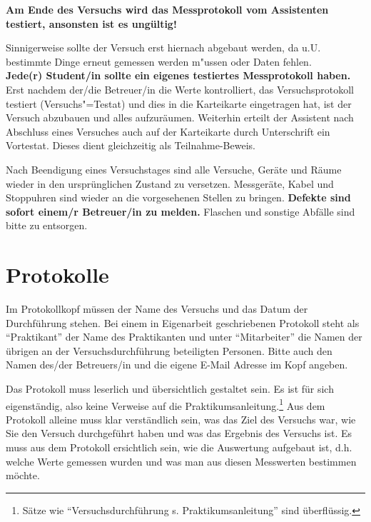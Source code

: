 \textbf{Am Ende des Versuchs wird das Messprotokoll vom Assistenten testiert, ansonsten ist es ungültig!}

Sinnigerweise sollte der Versuch erst hiernach abgebaut werden, da u.U. bestimmte Dinge erneut gemessen werden m"ussen oder Daten fehlen.\\ 
{\bf Jede(r) Student/in sollte ein eigenes testiertes Messprotokoll haben.}\\
Erst nachdem der/die Betreuer/in die Werte kontrolliert, das Versuchsprotokoll testiert (Versuchs"=Testat)  und dies in die Karteikarte eingetragen hat,
ist der Versuch abzubauen und alles aufzuräumen. Weiterhin erteilt der Assistent nach Abschluss eines Versuches auch auf der Karteikarte durch Unterschrift ein Vortestat. Dieses dient gleichzeitig als Teilnahme-Beweis.

Nach Beendigung eines Versuchstages sind alle Versuche, Geräte und Räume wieder in den ursprünglichen Zustand zu versetzen. Messgeräte, Kabel und Stoppuhren sind wieder an die vorgesehenen Stellen zu bringen. \textbf{Defekte sind sofort einem/r Betreuer/in zu melden.} Flaschen und sonstige Abfälle sind bitte zu entsorgen.


\section{Protokolle}

Im Protokollkopf müssen der Name des Versuchs und das Datum der Durchführung stehen. Bei einem in Eigenarbeit geschriebenen Protokoll steht als "`Praktikant"' der Name des Praktikanten und unter "`Mitarbeiter"' die Namen der übrigen an der Versuchsdurchführung beteiligten Personen. Bitte auch den Namen des/der Betreuers/in und die eigene E-Mail Adresse im Kopf angeben. 

Das Protokoll muss leserlich und übersichtlich gestaltet sein. Es ist für sich eigenständig, also keine Verweise auf die Praktikumsanleitung.\footnote{Sätze wie "`Versuchsdurchführung s. Praktikumsanleitung"' sind überflüssig.} Aus dem Protokoll alleine muss klar verständlich sein, was das Ziel des Versuchs war, wie Sie den Versuch durchgeführt haben und was das Ergebnis des Versuchs ist. Es muss aus dem Protokoll ersichtlich sein, wie die Auswertung aufgebaut ist, d.h. welche Werte gemessen wurden und was man aus diesen Messwerten bestimmen möchte.

